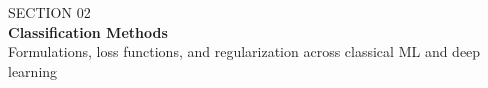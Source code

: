 \documentclass[aspectratio=169,11pt]{beamer}
\begin{document}
{
\begin{frame}[plain]
  \vspace*{1.25cm}
  {\fontsize{13}{16}\selectfont \color{tealaccent} SECTION 02}\\[0.4em]
  {\fontsize{24}{28}\selectfont \textbf{\color{white} Classification Methods}}\\[0.8em]
  {\fontsize{12}{15}\selectfont \color{slate} Formulations, loss functions, and regularization across classical ML and deep learning}
\end{frame}
}

\end{document}
